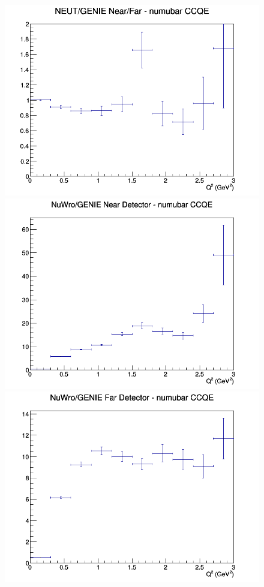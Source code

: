 \documentclass[12pt]{article}
\begin{document}
\begin{figure}[h]
\endminipage
{}
\includegraphics[width=\linewidth]{eff_Q2/GAr/ratios/CCQE_NEUT_GENIE_numubar_NF_Q2.png}
\endminipage
\newline
{}
\includegraphics[width=\linewidth]{eff_Q2/GAr/ratios/CCQE_NuWro_GENIE_numubar_near_Q2.png}
\endminipage
{}
\includegraphics[width=\linewidth]{eff_Q2/GAr/ratios/CCQE_NuWro_GENIE_numubar_far_Q2.png}

\end{figure}
\end{document}
